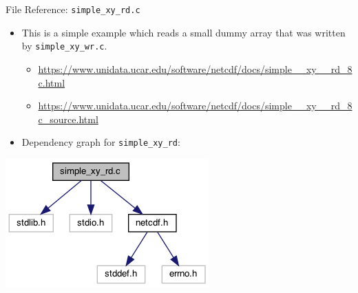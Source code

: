 \documentclass[compress,11pt,xcolor=svgnames,aspectratio=169]{beamer}
\begin{document}
\begin{frame}[fragile]{File Reference: \texttt{simple\_xy\_rd.c}}

\begin{itemize}
\setlength\itemsep{0.4cm}

  \item This is a simple example which reads a small dummy array that was written by \verb|simple_xy_wr.c|.

    \begin{itemize}
    \setlength\itemsep{0.2cm}
      \item {\scriptsize \url{https://www.unidata.ucar.edu/software/netcdf/docs/simple__xy__rd_8c.html}}
      \item {\scriptsize \url{https://www.unidata.ucar.edu/software/netcdf/docs/simple__xy__rd_8c_source.html}}
    \end{itemize}

  \item Dependency graph for \verb|simple_xy_rd|:

\end{itemize}

\begin{center}
\includegraphics[scale=0.5]{fig/simple__xy__rd_8c__incl}
\end{center}

\end{frame}
\end{document}
